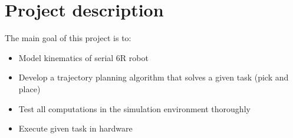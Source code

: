 \section*{Project description}{\label{sec:task}}
The main goal of this project is to:
\begin{itemize}
    \item Model kinematics of serial 6R robot
    \item Develop a trajectory planning algorithm that solves a given task
    (pick and place)
    \item Test all computations in the simulation environment thoroughly
    \item Execute given task in hardware
\end{itemize}
